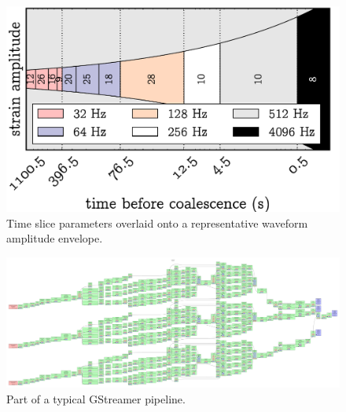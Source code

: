 \documentclass[portrait,plainboxedsections]{sciposter}
\begin{document}
\begin{minipage}[t]{0.25\textwidth}
\begin{figure}
\includegraphics[width=\textwidth]{figures/envelope}
\caption{\label{fig:time_slices} Time slice parameters overlaid onto a representative waveform amplitude envelope.}
\end{figure}

\begin{figure}
\includegraphics[width=\textwidth]{figures/network}
\caption{\label{fig:gstreamer}Part of a typical GStreamer pipeline.}
\end{figure}

\end{minipage}
\end{document}
